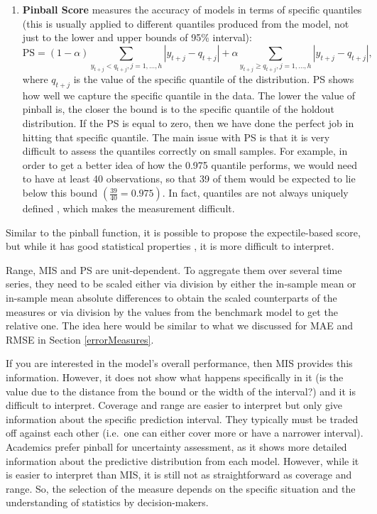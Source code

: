 \documentclass[
]{book}
\theoremstyle{definition}
\theoremstyle{definition}
\theoremstyle{definition}
\theoremstyle{definition}
\theoremstyle{remark}
\begin{document}
\begin{enumerate}
\item
  \textbf{Pinball Score} \citep{Koenker1978} measures the accuracy of models in terms of specific quantiles (this is usually applied to different quantiles produced from the model, not just to the lower and upper bounds of 95\% interval):
  \begin{equation}
   \mathrm{PS} = (1 -\alpha) \sum_{y_{t+j} < q_{t+j}, j=1,\dots,h } |y_{t+j} -q_{t+j}| + \alpha \sum_{y_{t+j} \geq q_{t+j} , j=1,\dots,h } |y_{t+j} -q_{t+j}|,
   \label{eq:pinball}
  \end{equation}
  where \(q_{t+j}\) is the value of the specific quantile of the distribution. PS shows how well we capture the specific quantile in the data. The lower the value of pinball is, the closer the bound is to the specific quantile of the holdout distribution. If the PS is equal to zero, then we have done the perfect job in hitting that specific quantile. The main issue with PS is that it is very difficult to assess the quantiles correctly on small samples. For example, in order to get a better idea of how the 0.975 quantile performs, we would need to have at least 40 observations, so that 39 of them would be expected to lie below this bound \(\left(\frac{39}{40} = 0.975\right)\). In fact, quantiles are not always uniquely defined \citep[see, for example,][]{Taylor2020}, which makes the measurement difficult.
\end{enumerate}

Similar to the pinball function, it is possible to propose the expectile-based score, but while it has good statistical properties \citep{Taylor2020}, it is more difficult to interpret.

Range, MIS and PS are unit-dependent. To aggregate them over several time series, they need to be scaled either via division by either the in-sample mean or in-sample mean absolute differences to obtain the scaled counterparts of the measures or via division by the values from the benchmark model to get the relative one. The idea here would be similar to what we discussed for MAE and RMSE in Section \ref{errorMeasures}.

If you are interested in the model's overall performance, then MIS provides this information. However, it does not show what happens specifically in it (is the value due to the distance from the bound or the width of the interval?) and it is difficult to interpret. Coverage and range are easier to interpret but only give information about the specific prediction interval. They typically must be traded off against each other (i.e.~one can either cover more or have a narrower interval). Academics prefer pinball for uncertainty assessment, as it shows more detailed information about the predictive distribution from each model. However, while it is easier to interpret than MIS, it is still not as straightforward as coverage and range. So, the selection of the measure depends on the specific situation and the understanding of statistics by decision-makers.
\end{document}
